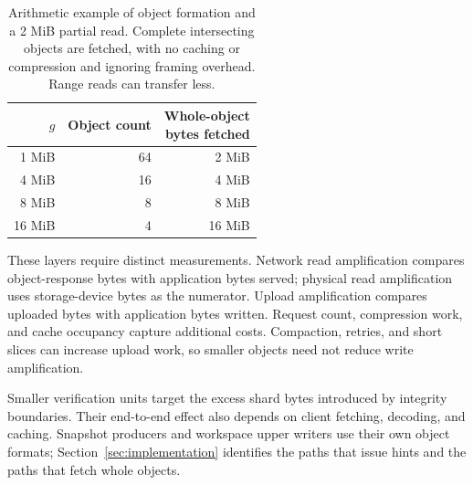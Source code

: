 \begin{table}[t]
\centering
\begin{tabular}{rrr}
\toprule
$g$ & Object count & \shortstack{Whole-object\\bytes fetched}\\
\midrule
1 MiB & 64 & 2 MiB\\
4 MiB & 16 & 4 MiB\\
8 MiB & 8 & 8 MiB\\
16 MiB & 4 & 16 MiB\\
\bottomrule
\end{tabular}
\caption{Arithmetic example of object formation and a 2 MiB partial
read. Complete intersecting objects are fetched, with no caching or
compression and ignoring framing overhead. Range reads can transfer less.}
\label{tab:object-granularity}
\end{table}

These layers require distinct measurements. Network read amplification
compares object-response bytes with application bytes served; physical
read amplification uses storage-device bytes as the numerator. Upload
amplification compares uploaded bytes with application bytes written.
Request count, compression work, and cache occupancy capture additional
costs. Compaction, retries, and short slices can increase upload work,
so smaller objects need not reduce write amplification.

Smaller verification units target the excess shard bytes introduced by
integrity boundaries. Their end-to-end effect also depends on client
fetching, decoding, and caching. Snapshot producers and workspace upper
writers use their own object formats; Section~\ref{sec:implementation}
identifies the paths that issue hints and the paths that fetch whole objects.
